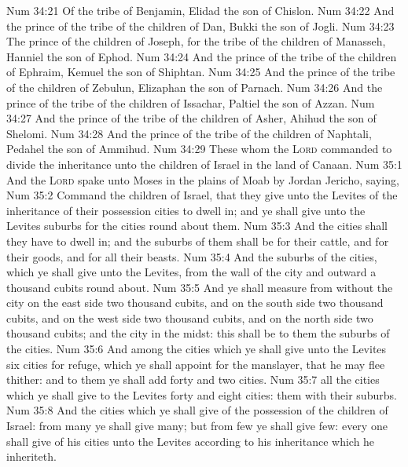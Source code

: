 \vs Num 34:21 Of the tribe of Benjamin, Elidad the son of Chislon.
\vs Num 34:22 And the prince of the tribe of the children of Dan, Bukki the son of Jogli.
\vs Num 34:23 The prince of the children of Joseph, for the tribe of the children of Manasseh, Hanniel the son of Ephod.
\vs Num 34:24 And the prince of the tribe of the children of Ephraim, Kemuel the son of Shiphtan.
\vs Num 34:25 And the prince of the tribe of the children of Zebulun, Elizaphan the son of Parnach.
\vs Num 34:26 And the prince of the tribe of the children of Issachar, Paltiel the son of Azzan.
\vs Num 34:27 And the prince of the tribe of the children of Asher, Ahihud the son of Shelomi.
\vs Num 34:28 And the prince of the tribe of the children of Naphtali, Pedahel the son of Ammihud.
\vs Num 34:29 These  whom the \textsc{Lord} commanded to divide the inheritance unto the children of Israel in the land of Canaan.
\vs Num 35:1 And the \textsc{Lord} spake unto Moses in the plains of Moab by Jordan  Jericho, saying,
\vs Num 35:2 Command the children of Israel, that they give unto the Levites of the inheritance of their possession cities to dwell in; and ye shall give  unto the Levites suburbs for the cities round about them.
\vs Num 35:3 And the cities shall they have to dwell in; and the suburbs of them shall be for their cattle, and for their goods, and for all their beasts.
\vs Num 35:4 And the suburbs of the cities, which ye shall give unto the Levites,  from the wall of the city and outward a thousand cubits round about.
\vs Num 35:5 And ye shall measure from without the city on the east side two thousand cubits, and on the south side two thousand cubits, and on the west side two thousand cubits, and on the north side two thousand cubits; and the city  in the midst: this shall be to them the suburbs of the cities.
\vs Num 35:6 And among the cities which ye shall give unto the Levites  six cities for refuge, which ye shall appoint for the manslayer, that he may flee thither: and to them ye shall add forty and two cities.
\vs Num 35:7  all the cities which ye shall give to the Levites  forty and eight cities: them  with their suburbs.
\vs Num 35:8 And the cities which ye shall give  of the possession of the children of Israel: from  many ye shall give many; but from  few ye shall give few: every one shall give of his cities unto the Levites according to his inheritance which he inheriteth.
